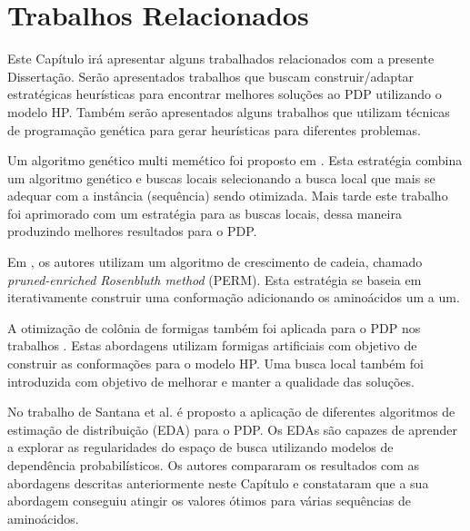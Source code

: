 \chapter{Trabalhos Relacionados}
\label{cap:Trabalhos Relacionados}

Este Capítulo irá apresentar alguns trabalhados relacionados com a presente Dissertação. Serão apresentados trabalhos que buscam construir/adaptar estratégicas heurísticas para encontrar melhores soluções ao PDP utilizando o modelo HP. Também serão apresentados alguns trabalhos que utilizam técnicas de programação genética para gerar heurísticas para diferentes problemas.






Um algoritmo genético multi memético foi proposto em \cite{krasnogor2002multimeme}. Esta estratégia combina um algoritmo genético e buscas locais selecionando a busca local que mais se adequar com a instância (sequência) sendo otimizada. Mais tarde este trabalho foi aprimorado com um estratégia  para as buscas locais, dessa maneira produzindo melhores resultados para o PDP.

Em \cite{hsu2003growth}, os autores utilizam um algoritmo de crescimento de cadeia, chamado \textit{pruned-enriched Rosenbluth method} (PERM). Esta estratégia se baseia em iterativamente construir uma conformação adicionando os aminoácidos um a um. 

A otimização de colônia de formigas também foi aplicada para o PDP nos trabalhos \cite{shmygelska2002ant,shmygelska2003improved}. Estas abordagens utilizam formigas artificiais com objetivo de construir as conformações para o modelo HP. Uma busca local também foi introduzida com objetivo de melhorar e manter a qualidade das soluções. 

No trabalho de Santana et al. \cite{santana2008protein} é proposto a aplicação de diferentes algoritmos de estimação de distribuição (EDA) para o PDP. Os EDAs são capazes de aprender a explorar as regularidades do espaço de busca utilizando modelos de dependência probabilísticos. Os autores compararam os resultados com as abordagens descritas anteriormente neste Capítulo e constataram que a sua abordagem conseguiu atingir os valores ótimos para várias sequências de aminoácidos.

